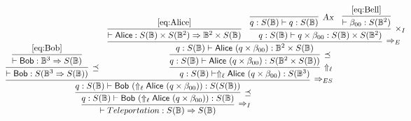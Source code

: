 \documentclass[preprint]{elsarticle}
\newcommand\B{\ensuremath{\mathbb B}}
\newcommand\s[1]{\ensuremath{\mathsf{#1}}}
\newcommand\tax{\textsl{Ax}}
\begin{document}
\[
  \hspace{-2cm}\infer[\Rightarrow_I]
  {\vdash Teleportation: S(\B)\Rightarrow S(\B)}
  {
    \infer[\preceq]
    {q:S(\B)\vdash \s {Bob} \ (\Uparrow_\ell \s {Alice} \ (q\times\beta_ {00})):S(\B)}
    {
      \infer[\Rightarrow_ {ES}]
      {q:S(\B)\vdash \s {Bob} \ (\Uparrow_\ell \s {Alice} \ (q\times\beta_ {00})):S(S(\B))}
      {
        \infer[\preceq]
        {\vdash \s {Bob} :S(\B^3\Rightarrow S(\B))}
        {
          \infer {\vdash \s {Bob} :\B^3\Rightarrow S(\B)}
          {\eqref {eq:Bob}}
        }
        &
        \infer[\Uparrow_\ell]
        {q:S(\B)\vdash \Uparrow_\ell  \s {Alice} \ (q\times\beta_ {00}): S(\B^3)}
        {
          \infer[\preceq]
          {q:S(\B)\vdash \s {Alice} \ (q\times\beta_ {00}): S(\B^2\times S(\B))}
          {
            \infer[\Rightarrow_E]
            {q:S(\B)\vdash \s {Alice} \ (q\times\beta_ {00}): \B^2\times S(\B)}
            {
              \infer {\vdash \s {Alice} :S(\B)\times S(\B^2)\Rightarrow\B^2\times S(\B)}
              {\eqref {eq:Alice}}
              &
              \infer[\times_I]
              {q:S(\B)\vdash q\times\beta_ {00} :S(\B)\times S(\B^2)}
              {
                \infer[\tax]
                {q:S(\B)\vdash q:S(\B)}
                {}
                &
                \infer {\vdash\beta_ {00} :S(\B^2)}
                {\eqref {eq:Bell}}
              }
            }
          }
        }
      }
    }
  }
\]
\end{document}
